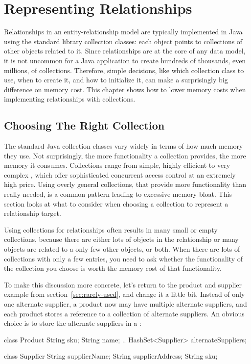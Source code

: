 \chapter{Representing Relationships}
\label{chapter:representing-relationships}

Relationships in an
entity-relationship model are typically implemented in Java using the
standard library collection classes:
each object points to collections of other objects related to it.
Since relationships are at the core of any data model, it
 is not uncommon for a Java application to create hundreds of
thousands, even millions, of collections. Therefore, simple decisions, like
which collection class to use, when to create it, and how to initialize it,
can make a surprisingly big difference on memory cost.
This chapter shows
 how to lower memory costs when implementing relationships with collections.
 
 \section{Choosing The Right Collection}
 \label{section:choosing-collection}


The standard Java collection classes vary widely in terms of how much memory they use.
Not surprisingly, the more functionality a collection provides, the more
memory it consumes. Collections range from simple, highly efficient
 to very complex
, which offer sophisticated concurrent access
control at an extremely high price. 
Using overly general collections, that provide more functionality than
really needed, is a common pattern leading to excessive memory bloat.
This section looks at what to consider when choosing a collection to
represent a relationship target. 

Using collections for relationships often results in many small or empty
collections, because there are either lots of objects in the relationship or
 many objects are related to a only few other objects, or both. When there
are lots of collections with only a few entries, you need to ask  whether the
functionality of the collection you choose is worth the memory cost of that
functionality.

To make this discussion more concrete, let's return to the product and supplier example 
from section~\ref{sec:rarely-used}, and change it a little
 bit. Instead of only one alternate supplier, a product now may have multiple
 alternate suppliers, and each product stores a reference to a collection of alternate suppliers. An obvious choice is
 to store the alternate suppliers in a :
 \begin{shortlisting} 
class Product {
	String sku;
	String name;
	.. 
	HashSet<Supplier> alternateSuppliers;
}

class Supplier {
	String supplierName;
	String supplierAddress;
	String sku;
}
\end{shortlisting}
 

